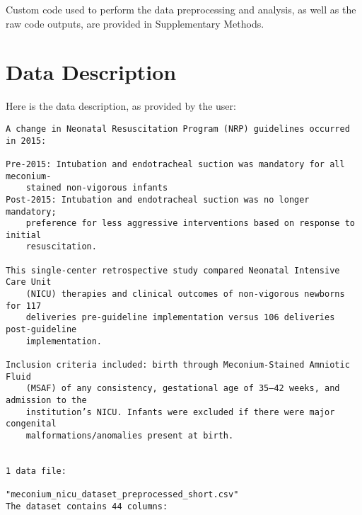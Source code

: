 \documentclass[11pt]{article}
\begin{document}
Custom code used to perform the data preprocessing and analysis, as well as the raw code outputs, are provided in Supplementary Methods.


\clearpage
\appendix

\section{Data Description} \label{sec:data_description} Here is the data description, as provided by the user:

\begin{Verbatim}[tabsize=4]
A change in Neonatal Resuscitation Program (NRP) guidelines occurred in 2015:

Pre-2015: Intubation and endotracheal suction was mandatory for all meconium-
	stained non-vigorous infants
Post-2015: Intubation and endotracheal suction was no longer mandatory;
	preference for less aggressive interventions based on response to initial
	resuscitation.

This single-center retrospective study compared Neonatal Intensive Care Unit
	(NICU) therapies and clinical outcomes of non-vigorous newborns for 117
	deliveries pre-guideline implementation versus 106 deliveries post-guideline
	implementation.

Inclusion criteria included: birth through Meconium-Stained Amniotic Fluid
	(MSAF) of any consistency, gestational age of 35–42 weeks, and admission to the
	institution’s NICU. Infants were excluded if there were major congenital
	malformations/anomalies present at birth.


1 data file:

"meconium_nicu_dataset_preprocessed_short.csv"
The dataset contains 44 columns:


\end{Verbatim}
\end{document}
